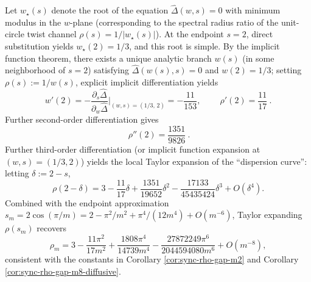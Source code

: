 \begin{remark}[Endpoint derivative fingerprint: \texorpdfstring{$\rho'(2)=11/17$}{rho'(2)=11/17}]\label{rem:sync-rho-derivative-fingerprint}
Let \(w_\star(s)\) denote the root of the equation \(\widehat\Delta(w,s)=0\) with minimum modulus in the \(w\)-plane (corresponding to the spectral radius ratio of the unit-circle twist channel \(\rho(s)=1/|w_\star(s)|\)).
At the endpoint \(s=2\), direct substitution yields \(w_\star(2)=1/3\), and this root is simple.
By the implicit function theorem, there exists a unique analytic branch \(w(s)\) (in some neighborhood of \(s=2\)) satisfying
\(\widehat\Delta(w(s),s)=0\) and \(w(2)=1/3\);
setting \(\rho(s):=1/w(s)\), explicit implicit differentiation yields
\[
w'(2)=-\frac{\partial_s\widehat\Delta}{\partial_w\widehat\Delta}\Big|_{(w,s)=(1/3,\,2)}=-\frac{11}{153},
\qquad
\boxed{\ \rho'(2)=\frac{11}{17}\ }.
\]
Further second-order differentiation gives
\[
\boxed{\ \rho''(2)=\frac{1351}{9826}\ }.
\]
Further third-order differentiation (or implicit function expansion at \((w,s)=(1/3,2)\)) yields the local Taylor expansion of the ``dispersion curve'': letting \(\delta:=2-s\),
\[
\boxed{\;
\rho(2-\delta)=3-\frac{11}{17}\delta+\frac{1351}{19652}\delta^2-\frac{17133}{45435424}\delta^3+O(\delta^4).\;}
\]
Combined with the endpoint approximation
\(
s_m=2\cos(\pi/m)=2-\pi^2/m^2+\pi^4/(12m^4)+O(m^{-6})
\),
Taylor expanding \(\rho(s_m)\) recovers
\[
\rho_m
=3-\frac{11\pi^2}{17m^2}
+\frac{1808\pi^4}{14739m^4}
-\frac{27872249\pi^6}{2044594080m^6}
+O(m^{-8}),
\]
consistent with the constants in Corollary \ref{cor:sync-rho-gap-m2} and Corollary \ref{cor:sync-rho-gap-m8-diffusive}.
\end{remark}

